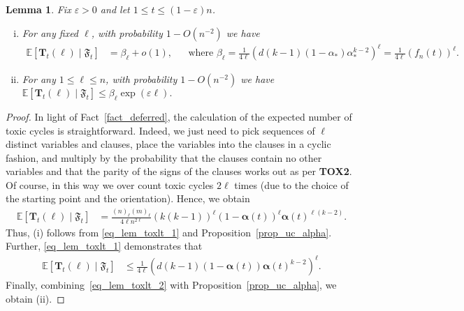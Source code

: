 \documentclass[10pt,reqno]{amsart}
\numberwithin{equation}{section}
\renewcommand{\vec}[1]{\boldsymbol{#1}}
\newcommand\fF{\mathfrak F}
\newcommand\vT{\vec T}
\newcommand\eps{\varepsilon}
\newcommand\Erw{\mathbb{E}}
\newcommand\ex{\Erw}
\newcommand\bc[1]{\left({#1}\right)}
\newcommand\brk[1]{\left\lbrack{#1}\right\rbrack}
\newcommand\Prop{Proposition}
\newtheorem{lemma}[definition]{Lemma}
\begin{document}
	\begin{lemma}\label{lem_toxlt}
	Fix $\eps>0$ and let $1\leq t\leq(1-\eps)n$.
	\begin{enumerate}[(i)]
		\item For any fixed $\ell$, with probability $1-O(n^{-2})$ we have
		\begin{align*}
			\ex\brk{\vT_t\bc\ell\mid\fF_t}&=\beta_\ell+o(1),&&\mbox{where }\beta_\ell=\frac{1}{4\ell} \bc{ d(k-1) (1-\alpha_*)\alpha_*^{k-2} }^\ell = \frac 1 {4\ell} \bc{f_n(t)}^\ell.
		\end{align*}
	\item For any $1\leq\ell\leq n$, with probability $1-O(n^{-2})$ we have $\ex\brk{\vT_t\bc{\ell}\mid\fF_t}\leq\beta_\ell\exp(\eps\ell).$ \end{enumerate}
	\end{lemma}
	\begin{proof}
		In light of Fact~\ref{fact_deferred}, the calculation of the expected number of toxic cycles is straightforward.
		Indeed, we just need to pick sequences of $\ell$ distinct variables and clauses, place the variables into the clauses in a cyclic fashion, and multiply by the probability that the clauses contain no other variables and that the parity of the signs of the clauses works out as per {\bf TOX2}.
		Of course, in this way we over count toxic cycles $2\ell$ times (due to the choice of the starting point and the orientation).
		Hence, we obtain
		\begin{align}\label{eq_lem_toxlt_1}
			\Erw\brk{\vT_t(\ell) \mid \fF_t}  &= \frac{(n)_\ell (m)_{\ell}}{4\ell n^{2\ell}}  \bc{k(k-1)}^\ell \bc{1-\vec\alpha(t)}^{\ell} \vec\alpha(t)^{\ell(k-2)}.
		\end{align}
		Thus, (i) follows from \eqref{eq_lem_toxlt_1} and \Prop~\ref{prop_uc_alpha}.
		Further, \eqref{eq_lem_toxlt_1} demonstrates that
		\begin{align}\label{eq_lem_toxlt_2}
			\Erw\brk{\vT_t(\ell) \mid \fF_t}  &\leq \frac{1}{4\ell} \bc{ d(k-1) (1-\vec\alpha(t))\vec\alpha(t)^{k-2} }^\ell.
		\end{align}
		Finally, combining~\eqref{eq_lem_toxlt_2} with  \Prop~\ref{prop_uc_alpha}, we obtain (ii).
	\end{proof}
	
\end{document}
